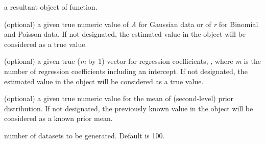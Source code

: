\documentclass[a4paper]{book}
\begin{document}
%
\begin{Arguments}
\begin{ldescription}
\item[\code{gbp.object}] 
a resultant object of  function. 

\item[\code{A.or.r}] 
(optional) a given true numeric value of \emph{A} for Gaussian data or of \emph{r} for Binomial and Poisson data. If not designated, the estimated value in the  object will be considered as a true value.

\item[\code{reg.coef}] 
(optional) a given true (\emph{m} by 1) vector for regression coefficients, \eqn{\beta}{}, where \emph{m} is the number of regression coefficients including an intercept. If not designated, the estimated value in the  object will be considered as a true value.

\item[\code{mean.PriorDist}] 
(optional) a given true numeric value for the mean of (second-level) prior distribution. If not designated, the previously known value in the  object will be considered as a known prior mean.

\item[\code{nsim}] 
number of datasets to be generated. Default is 100.

\end{ldescription}
\end{Arguments}
%
\end{document}
